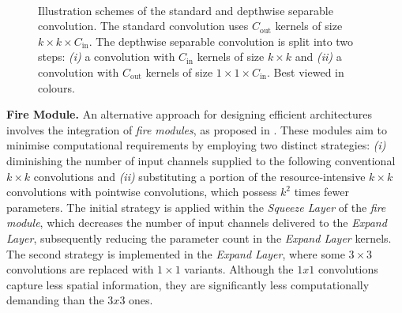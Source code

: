 \begin{figure}[htbp]
  \centering
  \\
  \vspace{1cm}
  \caption{Illustration schemes of the standard and depthwise separable
    convolution. The standard convolution uses $C_\text{out}$ kernels of size
    $k\times k \times C_\text{in}$. The depthwise separable convolution is
    split into two steps: \emph{(i)} a convolution with $C_\text{in}$ kernels
    of size $k \times k$ and \emph{(ii)} a convolution with $C_\text{out}$
    kernels of size $1\times 1 \times C_\text{in}$.
    Best viewed in colours.}
  \label{fig:sota:depthwise_conv_vs_standard_conv}
\end{figure}


\textbf{Fire Module.} An alternative approach for designing efficient
architectures involves the integration of \emph{fire modules}, as proposed in
\cite{DBLP:journals/corr/IandolaMAHDK16}. These modules aim to minimise
computational requirements by employing two distinct strategies: \emph{(i)}
diminishing the number of input channels supplied to the following conventional
$k\times k$ convolutions and \emph{(ii)} substituting a portion of the
resource-intensive $k\times k$ convolutions with pointwise convolutions, which
possess $k^2$ times fewer parameters. The initial strategy is applied within the
\emph{Squeeze Layer} of the \emph{fire module}, which decreases the number of
input channels delivered to the \emph{Expand Layer}, subsequently reducing the
parameter count in the \emph{Expand Layer} kernels. The second strategy is
implemented in the \emph{Expand Layer}, where some $3\times3$ convolutions are
replaced with $1\times1$ variants. Although the $1x1$ convolutions capture less
spatial information, they are significantly less computationally demanding than
the $3x3$ ones.\\

